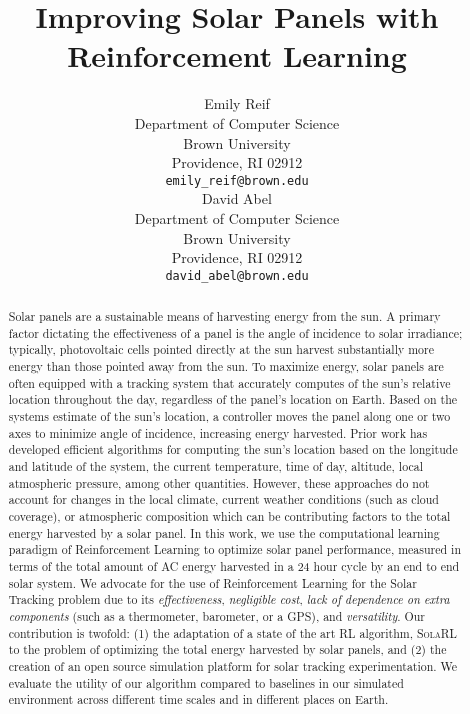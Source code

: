 \documentclass[11pt]{article}
\title{Improving Solar Panels with Reinforcement Learning}
\author{
Emily Reif \\
Department of Computer Science\\
Brown University\\
Providence, RI 02912 \\
\texttt{emily\_reif@brown.edu} \\
\And
David Abel \\
Department of Computer Science\\
Brown University \\
Providence, RI 02912 \\
\texttt{david\_abel@brown.edu} \\
}
\date{}
\begin{document}
\maketitle

\begin{abstract}
Solar panels are a sustainable means of harvesting energy from the sun. A primary factor dictating the effectiveness of a panel is the angle of incidence to solar irradiance; typically, photovoltaic cells pointed directly at the sun harvest substantially more energy than those pointed away from the sun. To maximize energy, solar panels are often equipped with a tracking system that accurately computes of the sun's relative location throughout the day, regardless of the panel's location on Earth. Based on the systems estimate of the sun's location, a controller moves the panel along one or two axes to minimize angle of incidence, increasing energy harvested. Prior work has developed efficient algorithms for computing the sun's location based on the longitude and latitude of the system, the current temperature, time of day, altitude, local atmospheric pressure, among other quantities.
%
However, these approaches do not account for changes in the local climate, current weather conditions (such as cloud coverage), or atmospheric composition which can be contributing factors to the total energy harvested by a solar panel.
%
In this work, we use the computational learning paradigm of Reinforcement Learning to optimize solar panel performance, measured in terms of the total amount of AC energy harvested in a 24 hour cycle by an end to end solar system. We advocate for the use of Reinforcement Learning for the Solar Tracking problem due to its {\it effectiveness}, {\it negligible cost}, {\it lack of dependence on extra components} (such as a thermometer, barometer, or a GPS), and {\it versatility}. Our contribution is twofold: (1) the adaptation of a state of the art RL algorithm, \textsc{SolaRL} to the problem of optimizing the total energy harvested by solar panels, and (2) the creation of an open source simulation platform for solar tracking experimentation. We evaluate the utility of our algorithm compared to baselines in our simulated environment across different time scales and in different places on Earth.
\end{abstract}

\end{document}
